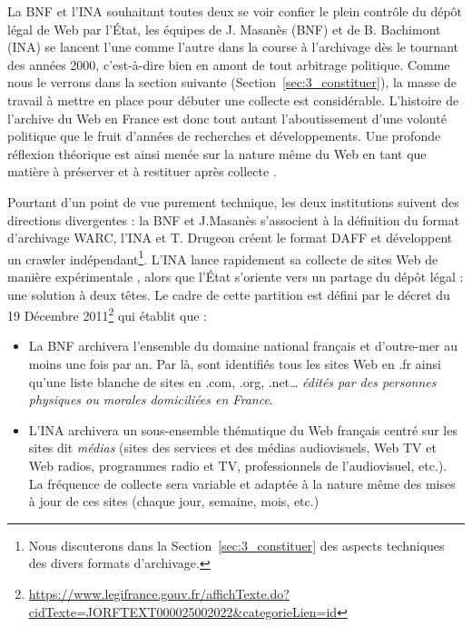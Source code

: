 \documentclass[symmetric,justified,marginals=raggedouter]{tufte-book}
\begin{document}
\noindent La BNF et l'INA souhaitant toutes deux se voir confier le plein contrôle du dépôt légal de Web par l'État, les équipes de J. Masanès (BNF) et de B. Bachimont (INA) se lancent l'une comme l'autre dans la course à l'archivage dès le tournant des années 2000, c'est-à-dire bien en amont de tout arbitrage politique. Comme nous le verrons dans la section suivante (Section~\ref{sec:3_constituer}), la masse de travail à mettre en place pour débuter une collecte est considérable. L'histoire de l'archive du Web en France est donc tout autant l'aboutissement d'une volonté politique que le fruit d'années de recherches et développements. Une profonde réflexion théorique est ainsi menée sur la nature même du Web en tant que matière à préserver et à restituer après collecte \citep{bachimont_archivage_2009}. 

Pourtant d'un point de vue purement technique, les deux institutions suivent des directions divergentes : la BNF et J.Masanès s'associent à la définition du format d'archivage WARC, l'INA et T. Drugeon créent le format DAFF et développent un crawler indépendant\footnote{\RaggedOuter Nous discuterons dans la Section~\ref{sec:3_constituer} des aspects techniques des divers formats d'archivage.}. L'INA lance rapidement sa collecte de sites Web de manière expérimentale \citep{bachimont_documenter_2005}, alors que l'État s'oriente vers un partage du dépôt légal : une solution à deux têtes. Le cadre de cette partition est défini par le décret du 19 Décembre 2011\footnote{\RaggedOuter \url{https://www.legifrance.gouv.fr/affichTexte.do?cidTexte=JORFTEXT000025002022&categorieLien=id}} qui établit que :

\begin{itemize}[leftmargin=*]  
\item La BNF archivera l'ensemble du domaine national français et d'outre-mer au moins une fois par an. Par là, sont identifiés tous les sites Web en .fr ainsi qu'une liste blanche de sites en .com, .org, .net\ldots{} \og\textit{édités par des personnes physiques ou morales domiciliées en France}\fg{}.
\item L'INA archivera un sous-ensemble thématique du Web français centré sur les sites dit \textit{médias} (sites des services et des médias audiovisuels, Web TV et Web radios, programmes radio et TV, professionnels de l'audiovisuel, etc.). La fréquence de collecte sera variable et adaptée à la nature même des mises à jour de ces sites (chaque jour, semaine, mois, etc.)
\end{itemize}
\end{document}
